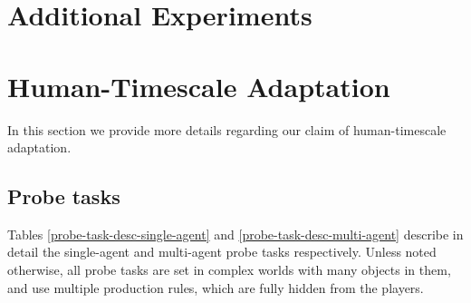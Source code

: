 \documentclass[11pt, a4paper, logo, copyright]{deepmind}
\begin{document}
\begin{appendix}

\newpage
\section{Additional Experiments}







\section{Human-Timescale Adaptation}\label{appendix:human_scale_adaptation}
In this section we provide more details regarding our claim of human-timescale adaptation.

\subsection{Probe tasks}\label{appendix:probe_tasks}

Tables \ref{probe-task-desc-single-agent} and \ref{probe-task-desc-multi-agent} describe in detail the single-agent and multi-agent probe tasks respectively. Unless noted otherwise, all probe tasks are set in complex worlds with many objects in them, and use multiple production rules, which are fully hidden from the players.


\end{appendix}
\end{document}
